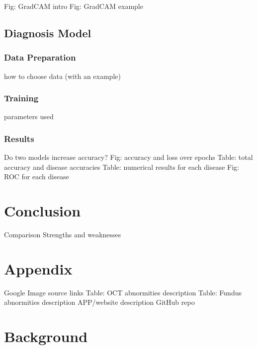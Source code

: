 \documentclass{article}
\begin{document}
				Fig: GradCAM intro
				Fig: GradCAM example
		
	\subsection{Diagnosis Model}
	
		\subsubsection{Data Preparation}
		
			how to choose data (with an example)
		
		\subsubsection{Training}
		
			parameters used
		
		\subsubsection{Results}
			
			Do two models increase accuracy?
			Fig: accuracy and loss over epochs
			Table: total accuracy and disease accuracies
			Table: numerical results for each disease
			Fig: ROC for each disease
	
	\section{Conclusion}
	
		Comparison
		Strengths and weaknesses
	
	\section{Appendix}
	
		Google Image source links
		Table: OCT abnormities description
		Table: Fundus abnormities description
		APP/website description
		GitHub repo
	
	
	
	
	
	
	\section{Background}
		
\end{document}
